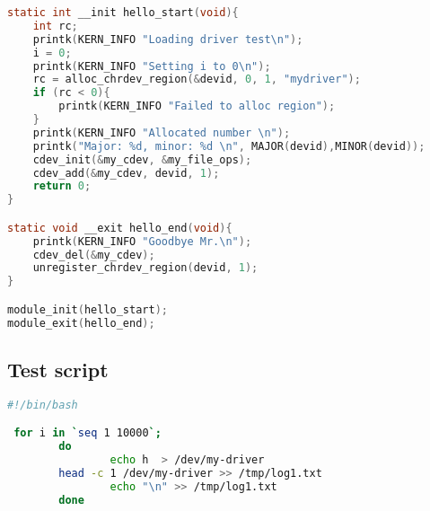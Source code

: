 \documentclass[..thesis.tex]{subfiles}
\begin{document}
\begin{lstlisting}[language=C,style=def]
static int __init hello_start(void){
    int rc;
    printk(KERN_INFO "Loading driver test\n");
    i = 0;
    printk(KERN_INFO "Setting i to 0\n");
    rc = alloc_chrdev_region(&devid, 0, 1, "mydriver");
    if (rc < 0){
        printk(KERN_INFO "Failed to alloc region");
    }
    printk(KERN_INFO "Allocated number \n");
    printk("Major: %d, minor: %d \n", MAJOR(devid),MINOR(devid));
    cdev_init(&my_cdev, &my_file_ops);
    cdev_add(&my_cdev, devid, 1);
    return 0;
}

static void __exit hello_end(void){
    printk(KERN_INFO "Goodbye Mr.\n");
    cdev_del(&my_cdev);
    unregister_chrdev_region(devid, 1);
}

module_init(hello_start);
module_exit(hello_end);
\end{lstlisting}

\newpage
\subsection{Test script} 
\label{A:test-script}


\begin{lstlisting}[language=sh,style=def]
#!/bin/bash 

 for i in `seq 1 10000`;
        do
                echo h  > /dev/my-driver
		head -c 1 /dev/my-driver >> /tmp/log1.txt
                echo "\n" >> /tmp/log1.txt
        done    
\end{lstlisting}

\newpage
\end{document}

